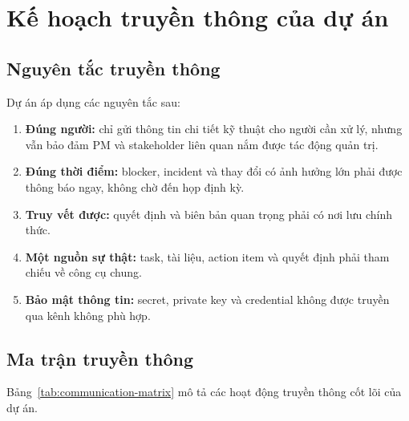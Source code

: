
\fi
\section{Kế hoạch truyền thông của dự án}

\subsection{Nguyên tắc truyền thông}

Dự án áp dụng các nguyên tắc sau:

\begin{enumerate}
  \item \textbf{Đúng người:} chỉ gửi thông tin chi tiết kỹ thuật cho người cần xử lý, nhưng vẫn bảo đảm PM và stakeholder liên quan nắm được tác động quản trị.
  \item \textbf{Đúng thời điểm:} blocker, incident và thay đổi có ảnh hưởng lớn phải được thông báo ngay, không chờ đến họp định kỳ.
  \item \textbf{Truy vết được:} quyết định và biên bản quan trọng phải có nơi lưu chính thức.
  \item \textbf{Một nguồn sự thật:} task, tài liệu, action item và quyết định phải tham chiếu về công cụ chung.
  \item \textbf{Bảo mật thông tin:} secret, private key và credential không được truyền qua kênh không phù hợp.
\end{enumerate}

\subsection{Ma trận truyền thông}

Bảng~\ref{tab:communication-matrix} mô tả các hoạt động truyền thông cốt lõi của dự án.

